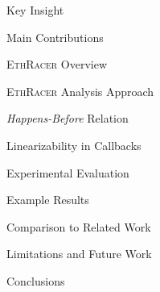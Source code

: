\documentclass[9pt]{beamer}
\begin{document}

%
\begin{frame}{Key Insight}
\end{frame}
%
\begin{frame}{Main Contributions}
\end{frame}
%
\begin{frame}{\textsc{EthRacer} Overview}
\end{frame}
%
\begin{frame}{\textsc{EthRacer} Analysis Approach}
\end{frame}
%
\begin{frame}{\textit{Happens-Before} Relation}
\end{frame}
%
\begin{frame}{Linearizability in Callbacks}
\end{frame}
%
\begin{frame}{Experimental Evaluation}
\end{frame}
%
\begin{frame}{Example Results}
\end{frame}
%
\begin{frame}{Comparison to Related Work}
\end{frame}
%
\begin{frame}{Limitations and Future Work}
\end{frame}
%
\begin{frame}{Conclusions}
\end{frame}
%
\begin{frame}{}
  \centering\huge\sffamily
  \textbf{}
\end{frame}
%
\begin{frame}[allowframebreaks]{}
  \scriptsize
  
  
\end{frame}
%
\end{document}
